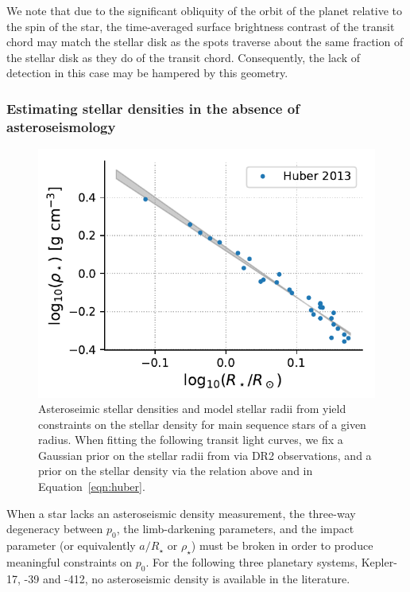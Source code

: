 We note that due to the significant obliquity of the orbit of the planet relative to the spin
of the star,
the time-averaged surface brightness contrast of the transit chord may match the stellar disk
as the spots traverse about the same fraction of the stellar disk as they do of the transit chord.  Consequently, the lack of detection in this case may be hampered by this geometry. 

\subsubsection{Estimating stellar densities in the absence of asteroseismology} \label{sec:huberapprox}

\begin{figure}
    \centering
    \includegraphics[scale=0.8]{robin/huber.pdf}
    \caption{Asteroseimic stellar densities and model stellar radii from \citet{Huber2013} yield constraints on the stellar density for main sequence stars of a given radius. When fitting the following transit light curves, we fix a Gaussian prior on the stellar radii from \citet{Berger2018} via \gaia DR2 observations, and a prior on the stellar density via the relation above and in Equation~\ref{eqn:huber}.}
    \label{fig:huber}
\end{figure}

When a star lacks an asteroseismic density measurement, the three-way degeneracy between $p_0$, the limb-darkening parameters, and the impact parameter (or equivalently $a/R_\star$ or $\rho_\star$) must be broken in order to produce meaningful constraints on $p_0$. For the following three planetary systems, Kepler-17, -39 and -412, no asteroseismic density is available in the literature.

